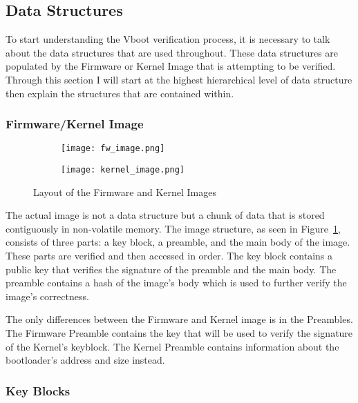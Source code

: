 \documentclass[../report.tex]{subfiles}
\begin{document}
\subsection{Data Structures}\label{sec:data-structures}

To start understanding the Vboot verification process, it is necessary to talk about the data structures that are used throughout. 
These data structures are populated by the Firmware or Kernel Image that is attempting to be verified.
Through this section I will start at the highest hierarchical level of data structure then explain the structures that are contained within.

\subsubsection{Firmware/Kernel Image}

\begin{figure}
\begin{subfigure}{.5\textwidth}
  \centering
  \texttt{[image: fw\_image.png]}
\end{subfigure}%
\begin{subfigure}{.5\textwidth}
  \centering
  \texttt{[image: kernel\_image.png]}
\end{subfigure}
\caption{Layout of the Firmware and Kernel Images~\cite{vboot-data-structures}}
\label{fig:vboot_images}
\end{figure}

The actual image is not a data structure but a chunk of data that is stored contiguously in non-volatile memory.
The image structure, as seen in Figure~\ref{fig:vboot_images}, consists of three parts: a key block, a preamble, and the main body of the image.
These parts are verified and then accessed in order.
The key block contains a public key that verifies the signature of the preamble and the main body. 
The preamble contains a hash of the image's body which is used to further verify the image's correctness.

The only differences between the Firmware and Kernel image is in the Preambles.
The Firmware Preamble contains the key that will be used to verify the signature of the Kernel's keyblock.
The Kernel Preamble contains information about the bootloader's address and size instead.

\subsubsection{Key Blocks}
\end{document}
